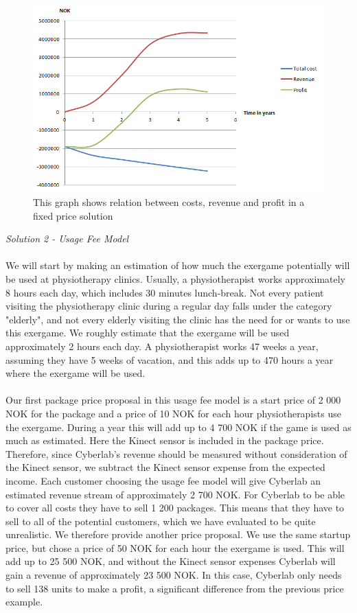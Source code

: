 \begin{figure}
\begin{center}
\includegraphics[scale=0.8]{profitfixed}
\caption[Profit, Revenue and Cost for a Fixed Price Solution]{This graph shows relation between costs, revenue and profit in a fixed price solution}
\label{fig:ProfitFixed}
\end{center}
\end{figure}
\emph{Solution 2 - Usage Fee Model}\\ \\
We will start by making an estimation of how much the exergame potentially will be used at physiotherapy clinics. Usually, a physiotherapist works approximately 8 hours each day, which includes 30 minutes lunch-break. Not every patient visiting the physiotherapy clinic during a regular day falls under the category "elderly", and not every elderly visiting the clinic has the need for or wants to use this exergame. We roughly estimate that the exergame will be used approximately 2 hours each day. A physiotherapist works 47 weeks a year, assuming they have 5 weeks of vacation, and this adds up to 470 hours a year where the exergame will be used.\\ \\
Our first package price proposal in this usage fee model is a start price of 2 000 NOK for the package and a price of 10 NOK for each hour physiotherapists use the exergame. During a year this will add up to 4 700 NOK if the game is used as much as estimated. Here the Kinect sensor is included in the package price. Therefore, since Cyberlab’s revenue should be measured without consideration of the Kinect sensor, we subtract the Kinect sensor expense from the expected income. Each customer choosing the usage fee model will give Cyberlab an estimated revenue stream of approximately 2 700 NOK. For Cyberlab to be able to cover all costs they have to sell 1 200 packages. This means that they have to sell to all of the potential customers, which we have evaluated to be quite unrealistic. We therefore provide another price proposal. We use the same startup price, but chose a price of 50 NOK for each hour the exergame is used. This will add up to 25 500 NOK, and without the Kinect sensor expenses Cyberlab will gain a revenue of approximately 23 500 NOK. In this case, Cyberlab only needs to sell 138 units to make a profit, a significant difference from the previous price example. \\ \\
